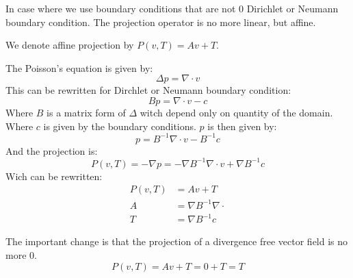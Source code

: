   In case where we use boundary conditions that are not 0 Dirichlet or Neumann boundary condition.
  The projection operator is no more linear, but affine.

  \begin{definition}
  We denote affine projection by $P(v,T)=Av+T$.
  
  The Poisson's equation is given by:
  \begin{equation}
   \Delta p=\nabla \cdot v
  \end{equation}
This can be rewritten for Dirchlet or Neumann boundary condition:
\begin{equation}
 B p=\nabla \cdot v-c
\end{equation}
Where $B$ is a matrix form of $\Delta$ witch depend only on quantity of the domain.
Where $c$ is given by the boundary conditions.
$p$ is then given by:
\begin{equation}
 p=B^{-1} \nabla \cdot v-B^{-1}c
\end{equation}
And the projection is:
\begin{equation}
 P(v,T)=-\nabla p=-\nabla B^{-1}\nabla \cdot v+\nabla B^{-1}c
\end{equation}
Wich can be rewritten:
\begin{align}
P(v,T)&=Av+T\\
A&=\nabla B^{-1}\nabla \cdot\\
T&=\nabla B^{-1}c
\end{align}
  
  \end{definition}
  
  The important change is that the projection of a divergence free vector field is no more 0.
  \begin{equation}
  P(v,T)=Av+T=0+T=T
  \end{equation}



